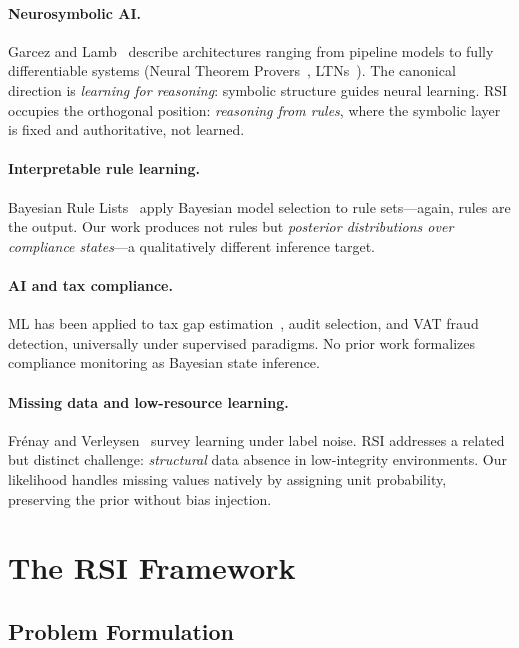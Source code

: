 \documentclass[letterpaper]{article}
\begin{document}
\paragraph{Neurosymbolic AI.}
Garcez and Lamb~\citeyearpar{garcez2022neural} describe architectures
ranging from pipeline models to fully differentiable systems (Neural
Theorem Provers~\citep{rocktaschel2017end}, LTNs~\citep{badreddine2022logic}).
The canonical direction is \emph{learning for reasoning}: symbolic
structure guides neural learning. RSI occupies the orthogonal position:
\emph{reasoning from rules}, where the symbolic layer is fixed and
authoritative, not learned.

\paragraph{Interpretable rule learning.}
Bayesian Rule Lists~\citep{letham2015interpretable} apply Bayesian
model selection to rule sets---again, rules are the output. Our work
produces not rules but \emph{posterior distributions over compliance
states}---a qualitatively different inference target.

\paragraph{AI and tax compliance.}
ML has been applied to tax gap estimation~\citep{gomes2022machine},
audit selection, and VAT fraud detection, universally under supervised
paradigms. No prior work formalizes compliance monitoring as Bayesian
state inference.

\paragraph{Missing data and low-resource learning.}
Fr\'enay and Verleysen~\citeyearpar{frenay2014classification} survey
learning under label noise. RSI addresses a related but distinct
challenge: \emph{structural} data absence in low-integrity environments.
Our likelihood handles missing values natively by assigning unit
probability, preserving the prior without bias injection.

\section{The RSI Framework}
\label{sec:framework}

\subsection{Problem Formulation}
\end{document}

